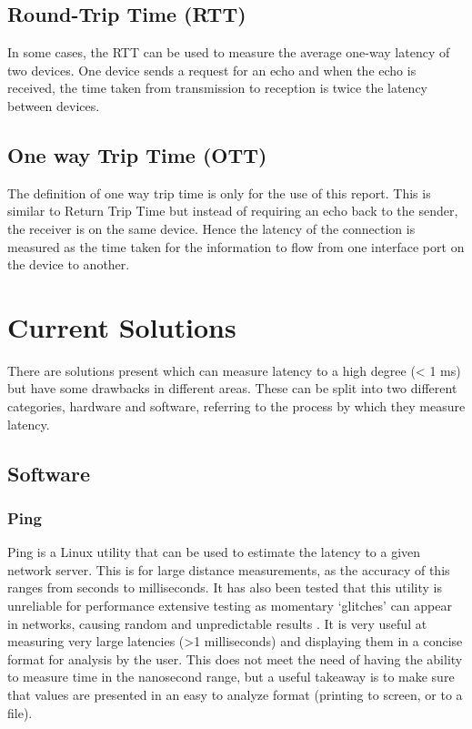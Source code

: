 \subsection{Round-Trip Time (RTT)}

In some cases, the RTT can be used to measure the average one-way latency of two devices. One
device sends a request for an echo and when the echo is received, the time taken from transmission to reception is
twice the latency between devices.

\subsection{One way Trip Time (OTT)}

The definition of one way trip time is only for the use of this report. This is similar to Return Trip Time but 
instead of requiring an echo back to the sender, the receiver is on the same device. Hence the latency of the 
connection is measured as the time taken for the information to flow from one interface port on the device to another.

\section{Current Solutions}

There are solutions present which can measure latency to a high degree (< 1 ms) but have some drawbacks in different 
areas. These can be split into two different categories, hardware and software, referring to the process by which 
they measure latency.

\subsection{Software}

\subsubsection{Ping}

Ping is a Linux utility that can be used to estimate the latency to a given network server. 
This is for large distance measurements, as the accuracy of this ranges from seconds to milliseconds. 
It has also been tested that this utility is unreliable for performance extensive testing as momentary ‘glitches’ 
can appear in networks, causing random and unpredictable results \cite{pingisbad}.
It is very useful at measuring very large latencies (>1 milliseconds) and displaying them in a concise format 
for analysis by the user. 
This does not meet the need of having the ability to measure time in the nanosecond range, but a useful takeaway 
is to make sure that values are presented in an easy to analyze format (printing to screen, or to a file).

